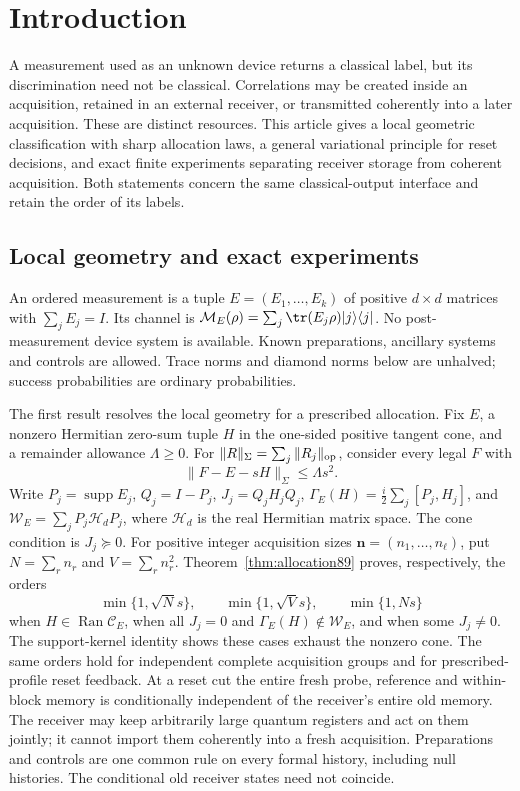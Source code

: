 \section{Introduction}\label{sec:introduction84}
A measurement used as an unknown device returns a classical label, but
its discrimination need not be classical.  Correlations may be created
inside an acquisition, retained in an external receiver, or transmitted
coherently into a later acquisition.  These are distinct resources.
This article gives a local geometric classification with sharp allocation
laws, a general variational principle for reset decisions, and exact
finite experiments separating receiver storage from coherent acquisition.  Both statements concern the same classical-output
interface and retain the order of its labels.

\subsection{Local geometry and exact experiments}
An ordered measurement is a tuple $E=(E_1,\ldots,E_k)$ of positive
$d\times d$ matrices with $\sum_jE_j=I$.  Its channel is
$\mathcal M_E(\rho)=\sum_j\tr(E_j\rho)|j\rangle\langle j|$.
No post-measurement device system is available.  Known preparations,
ancillary systems and controls are allowed.  Trace norms and diamond
norms below are unhalved; success probabilities are ordinary probabilities.

The first result resolves the local geometry for a prescribed allocation.
Fix $E$, a nonzero Hermitian zero-sum tuple $H$ in the one-sided positive
tangent cone, and a remainder allowance $\Lambda\ge0$.  For
$\|R\|_\Sigma=\sum_j\|R_j\|_{\rm op}$, consider every legal $F$ with
\begin{equation}\label{eq:fronttube87}
 \|F-E-sH\|_\Sigma\le\Lambda s^2.
\end{equation}
Write $P_j=\operatorname{supp}E_j$, $Q_j=I-P_j$,
$J_j=Q_jH_jQ_j$, $\Gamma_E(H)=\frac i2\sum_j[P_j,H_j]$, and
$\mathcal W_E=\sum_jP_j\mathcal H_dP_j$, where $\mathcal H_d$ is the
real Hermitian matrix space.  The cone condition is $J_j\succeq0$.
For positive integer acquisition sizes $\boldsymbol n=(n_1,\ldots,n_\ell)$,
put $N=\sum_rn_r$ and $V=\sum_rn_r^2$.
Theorem~\ref{thm:allocation89} proves, respectively, the orders
\begin{equation}\label{eq:frontprofile89}
 \min\{1,\sqrt N s\},\qquad \min\{1,\sqrt V s\},\qquad \min\{1,Ns\}
\end{equation}
when $H\in\operatorname{Ran}\mathcal C_E$, when all $J_j=0$ and
$\Gamma_E(H)\notin\mathcal W_E$, and when some $J_j\ne0$.
The support-kernel identity shows these cases exhaust the nonzero cone.
The same orders hold for independent complete acquisition groups and
for prescribed-profile reset feedback.  At a reset cut the entire fresh
probe, reference and within-block memory is conditionally independent
of the receiver's entire old memory.  The receiver may keep arbitrarily
large quantum registers and act on them jointly; it cannot import them
coherently into a fresh acquisition.  Preparations and controls are one
common rule on every formal history, including null histories.  The
conditional old receiver states need not coincide.

